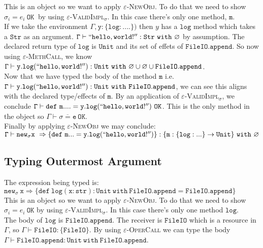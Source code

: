 \documentclass{llncs}
\newcommand{\kwa}[1]{\mathtt{#1}}
\newcommand{\kw}[1]{\kwa{#1}~}
\begin{document}
\noindent
This is an object so we want to apply \textsc{$\varepsilon$-NewObj}. To do that we need to show $\sigma_i = e_i~\kw{OK}$ by using \textsc{$\varepsilon$-ValidImpl$_\sigma$}. In this case there's only one method, $\kwa{m}$.\\

\noindent
If we take the environment $\kwa{\Gamma, y : \{ log : .... \})}$ then $y$ has a $\kwa{log}$ method which takes a $\kwa{Str}$ as an argument. $\kwa{\Gamma \vdash ``hello, world!'' : Str~with~\varnothing}$ by assumption. The declared return type of $\kwa{log}$ is $\kwa{Unit}$ and its set of effets of $\kwa{FileIO.append}$. So now using \textsc{$\varepsilon$-MethCall}, we know $\kwa{\Gamma \vdash y.log(``hello, world!'') : Unit~with~\varnothing \cup \varnothing \cup FileIO.append}$. \\

\noindent
Now that we have typed the body of the method $\kwa{m}$ i.e. $\kwa{\Gamma \vdash y.log(``hello, world!'') : Unit~with~FileIO.append}$, we can see this aligns with the declared type/effects of $\kwa{m}$. By an application of \textsc{$\varepsilon$-ValidImpl$_\sigma$}, we conclude $\kwa{\Gamma \vdash def~m .... = y.log(``hello, world!'')~OK}$. This is the only method in the object so $\kwa{\Gamma \vdash \overline{\sigma = e}~OK}$. \\

\noindent
Finally by applying \textsc{$\varepsilon$-NewObj} we may conclude:\\ $\kwa{\Gamma \vdash new_\sigma x~\Rightarrow \{ def~m ... = y.log(``hello, world!'') \} : \{ m : \{ log : ... \} \rightarrow Unit \}~\kw{with} \varnothing  }$

\noindent
\subsection*{Typing Outermost Argument}

The expression being typed is:
$\kwa{ new_\sigma~x \Rightarrow \{ def~log(x : str) : Unit~with~FileIO.append = FileIO.append \}}$\\

\noindent
This is an object so we want to apply \textsc{$\varepsilon$-NewObj}. To do that we need to show $\sigma_i = e_i~\kwa{OK}$ by using \textsc{$\varepsilon$-ValidImpl$_\sigma$}. In this case there's only one method $\kwa{log}$. \\

\noindent
The body of $\kwa{log}$ is $\kwa{FileIO.append}$. The receiver is $\kwa{FileIO}$ which is a resource in $\Gamma$, so $\kwa{\Gamma \vdash FileIO : \{ FileIO \}}$. By using \textsc{$\varepsilon$-OperCall} we can type the body $\kwa{\Gamma \vdash FileIO.append : Unit~\kw{with} FileIO.append}$. \\
\end{document}
